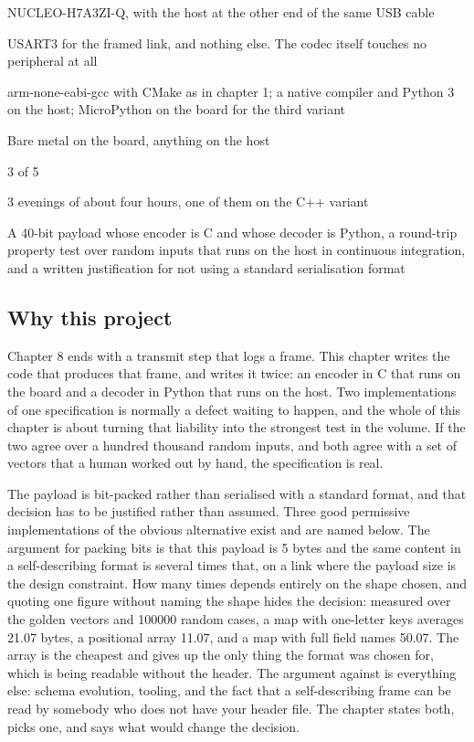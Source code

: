 
\begin{keyfacts}
\item[Board] NUCLEO-H7A3ZI-Q, with the host at the other end of the same USB cable
\item[Peripherals] USART3 for the framed link, and nothing else. The codec itself touches no peripheral at all
\item[Toolchain] arm-none-eabi-gcc with CMake as in chapter 1; a native compiler and Python 3 on the host; MicroPython on the board for the third variant
\item[Operating system] Bare metal on the board, anything on the host
\item[Difficulty] 3 of 5
\item[Effort] 3 evenings of about four hours, one of them on the C++ variant
\item[Deliverable] A 40-bit payload whose encoder is C and whose decoder is Python, a round-trip property test over random inputs that runs on the host in continuous integration, and a written justification for not using a standard serialisation format
\end{keyfacts}

\subsection*{Why this project}

Chapter 8 ends with a transmit step that logs a frame. This chapter writes the
code that produces that frame, and writes it twice: an encoder in C that runs on
the board and a decoder in Python that runs on the host. Two implementations of
one specification is normally a defect waiting to happen, and the whole of this
chapter is about turning that liability into the strongest test in the volume.
If the two agree over a hundred thousand random inputs, and both agree with a
set of vectors that a human worked out by hand, the specification is real.

The payload is bit-packed rather than serialised with a standard format, and
that decision has to be justified rather than assumed. Three good permissive
implementations of the obvious alternative exist and are named below. The
argument for packing bits is that this payload is 5 bytes and the same content
in a self-describing format is several times that, on a link where the payload
size is the design constraint. How many times depends entirely on the shape
chosen, and quoting one figure without naming the shape hides the decision:
measured over the golden vectors and 100000 random cases, a map with one-letter
keys averages 21.07 bytes, a positional array 11.07, and a map with full field
names 50.07. The array is the cheapest and gives up the only thing the format
was chosen for, which is being readable without the header. The argument against is everything else:
schema evolution, tooling, and the fact that a self-describing frame can be
read by somebody who does not have your header file. The chapter states both,
picks one, and says what would change the decision.

